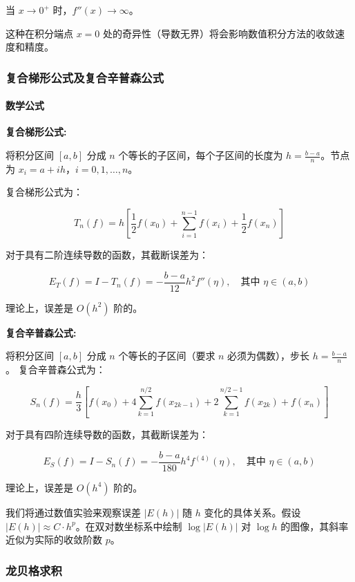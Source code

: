 \documentclass[11pt]{article}
\begin{document}
当 \(x \to 0^+\) 时，\(f''(x) \to \infty\)。

这种在积分端点 \(x=0\)
处的奇异性（导数无界）将会影响数值积分方法的收敛速度和精度。

\subsubsection{复合梯形公式及复合辛普森公式}\label{ux590dux5408ux68afux5f62ux516cux5f0fux53caux590dux5408ux8f9bux666eux68eeux516cux5f0f}

\paragraph{数学公式}\label{ux6570ux5b66ux516cux5f0f}

\textbf{复合梯形公式:}

将积分区间 \([a, b]\) 分成 \(n\) 个等长的子区间，每个子区间的长度为
\(h = \frac{b-a}{n}\)。节点为 \(x_i = a + ih\)，\(i=0, 1, \dots, n\)。

复合梯形公式为：

\[ T_n(f) = h \left[ \frac{1}{2}f(x_0) + \sum_{i=1}^{n-1} f(x_i) + \frac{1}{2}f(x_n) \right] \]

对于具有二阶连续导数的函数，其截断误差为：

\[ E_T(f) = I - T_n(f) = -\frac{b-a}{12}h^2 f''(\eta), \quad \text{其中 } \eta \in (a,b) \]

理论上，误差是 \(O(h^2)\) 阶的。

\textbf{复合辛普森公式:}

将积分区间 \([a, b]\) 分成 \(n\) 个等长的子区间（要求 \(n\)
必须为偶数），步长 \(h = \frac{b-a}{n}\)。 复合辛普森公式为：

\[ S_n(f) = \frac{h}{3} \left[ f(x_0) + 4\sum_{k=1}^{n/2} f(x_{2k-1}) + 2\sum_{k=1}^{n/2-1} f(x_{2k}) + f(x_n) \right] \]

对于具有四阶连续导数的函数，其截断误差为：

\[ E_S(f) = I - S_n(f) = -\frac{b-a}{180}h^4 f^{(4)}(\eta), \quad \text{其中 } \eta \in (a,b) \]

理论上，误差是 \(O(h^4)\) 阶的。

我们将通过数值实验来观察误差 \(|E(h)|\) 随 \(h\) 变化的具体关系。假设
\(|E(h)| \approx C \cdot h^p\)。在双对数坐标系中绘制 \(\log|E(h)|\) 对
\(\log h\) 的图像，其斜率近似为实际的收敛阶数 \(p\)。

\subsubsection{龙贝格求积}\label{ux9f99ux8d1dux683cux6c42ux79ef}
\end{document}
